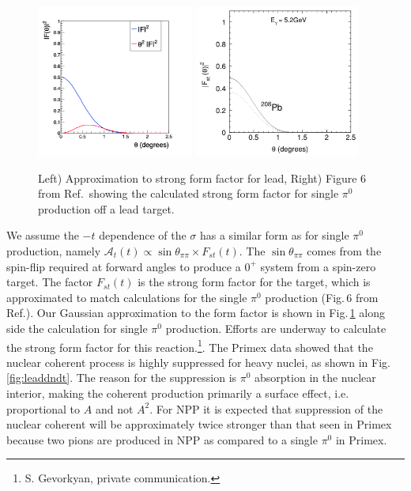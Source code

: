  \begin{figure}[tbh]
\begin{center}
\includegraphics[height=5cm,clip=true]{figures/fit_Primakoff_sigma_c1.png}
\includegraphics[height=5cm,clip=true]{figures/PRC80_2009_Fig6.png}
\caption{ Left) Approximation to strong form factor for lead, Right) Figure 6 from Ref.\,\cite{Gevorkyan:2009ge} showing the calculated strong form factor for single $\pi^0$ production off a lead target.
\label{fig:strongFF}}
\end{center}
\end{figure}

We assume the $-t$ dependence of the $\sigma$ has a similar form as for single $\pi^0$ production, namely $\mathcal{A}_t(t) \propto \sin{\theta_{\pi\pi}} \times F_{st}(t)$.  The $\sin{\theta_{\pi\pi}}$ 
comes from the spin-flip required at forward angles to produce a $0^+$ system from a spin-zero target. The factor $F_{st}(t)$ is the strong form factor for the target, which is approximated to
match calculations for the single $\pi^0$ production (Fig.\,6 from Ref.\cite{Gevorkyan:2009ge}). Our Gaussian approximation to the form factor is shown in Fig.\,\ref{fig:strongFF} along side the calculation for single 
$\pi^0$ production. Efforts are underway to calculate the strong form factor for this reaction.\footnote{S. Gevorkyan, private communication.}.
The Primex data showed that the nuclear coherent process is highly
suppressed for heavy nuclei, as shown in Fig.\ref{fig:leaddndt}.  The reason for the suppression is
$\pi^0$ absorption in the nuclear interior, making the coherent
production primarily a surface effect, i.e. proportional to $A$ and
not $A^2$.  For NPP it is expected that suppression of the nuclear  
coherent will be approximately twice stronger than that seen in Primex because two pions
are produced in NPP as compared to a single $\pi^0$ in Primex.  

